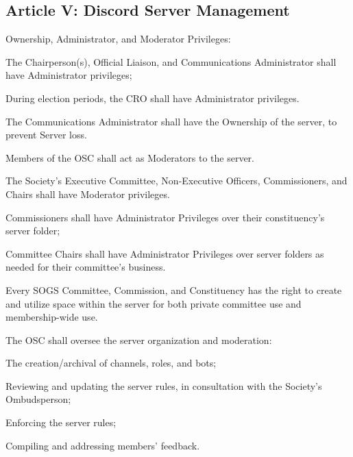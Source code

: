 \subsection{Article V: Discord Server Management}
\begin{longenum}[ label*=\thesubsection.\arabic*., align=left] 
	\item Ownership, Administrator, and Moderator Privileges:
		\begin{longenum}[label*=\arabic*., align=left]
		\item The Chairperson(s), Official Liaison, and Communications Administrator shall have Administrator privileges;
			\begin{longenum}[label*=\arabic*., align=left]
			\item During election periods, the CRO shall have Administrator privileges.
			\end{longenum}	
		\item The Communications Administrator shall have the Ownership of the server, to prevent Server loss.
		\item Members of the OSC shall act as Moderators to the server.
		\item The Society's Executive Committee, Non-Executive Officers, Commissioners, and Chairs shall have Moderator privileges.
			\begin{longenum}[label*=\arabic*., align=left]
			\item Commissioners shall have Administrator Privileges over their constituency's server folder;
			\item Committee Chairs shall have Administrator Privileges over server folders as needed for their committee's business.
			\end{longenum}	
		\end{longenum}	
	\item Every SOGS Committee, Commission, and Constituency has the right to create and utilize space within the server for both private committee use and membership-wide use.
	\item The OSC shall oversee the server organization and moderation:
		\begin{longenum}[label*=\arabic*., align=left]
		\item The creation/archival of channels, roles, and bots;
		\item Reviewing and updating the server rules, in consultation with the Society's Ombudsperson;
		\item Enforcing the server rules;
		\item Compiling and addressing members' feedback.

\end{longenum}
\end{longenum}
